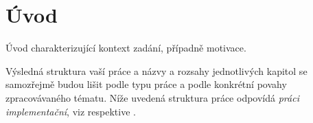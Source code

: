 \chapter{Úvod}
Úvod charakterizující kontext zadání, případně motivace.

Výsledná struktura vaší práce a názvy a rozsahy jednotlivých kapitol se samozřejmě budou lišit podle typu práce a podle konkrétní povahy zpracovávaného tématu. Níže uvedená struktura práce odpovídá \textit{práci implementační}, viz \cite{infodp} respektive \cite{infobp}.

